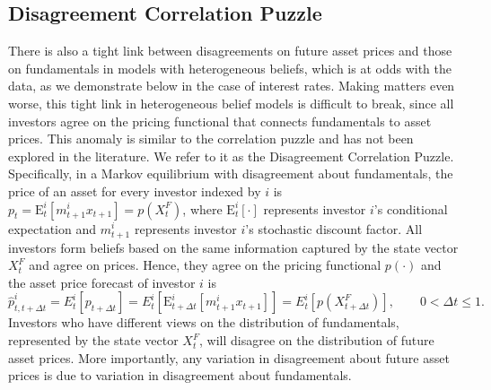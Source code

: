 \documentclass[preprint,11pt,authoryear]{elsarticle}
\theoremstyle{plain}
\begin{document}
\subsection{Disagreement Correlation Puzzle} \label{sec:dis}

There is also a tight link between disagreements on future asset prices and those on fundamentals in models with heterogeneous beliefs, which is at odds with the data, as we demonstrate below in the case of interest rates. Making matters even worse, this tight link in heterogeneous belief models is difficult to break, since all investors agree on the pricing functional that connects fundamentals to asset prices. This anomaly is similar to the correlation puzzle and has not been explored in the literature. We refer to it as the Disagreement Correlation Puzzle. Specifically, in a Markov equilibrium with disagreement about fundamentals, the price of an asset for every investor indexed by $i$ is $p_t = \mathrm{E}^i_{t} \left[ m^i_{t+1} x_{t+1} \right] = p \left(X_t^F \right)$,
where $\mathrm{E}^i_{t} \left[ \cdot \right]$ represents investor $i$'s conditional expectation and $m^i_{t+1}$ represents investor $i$'s stochastic discount factor. All investors form beliefs based on the same information captured by the state vector $X_t^F$ and agree on prices. Hence, they agree on the pricing functional $p(\cdot)$ and the asset price forecast of investor $i$ is  
\begin{equation} \label{eq:apforecast}
	\hat{p}^i_{t,t+\Delta t} = E^i_{t} \left[  p_{t+\Delta t}  \right] =  E^i_{t} \left[ \mathrm{E}^i_{t+\Delta t}  \left[ m^i_{t+1} x_{t+1} \right]  \right] = E^i_{t} \left[ p \left( X^F_{t+\Delta t} \right) \right],\qquad 0  < \Delta t \leq 1.
\end{equation}
Investors who have different views on the distribution of fundamentals, represented by the state vector $X_t^F$, will disagree on the distribution of future asset prices. More importantly, any variation in disagreement about future asset prices is due to variation in disagreement about fundamentals. %
\end{document}
